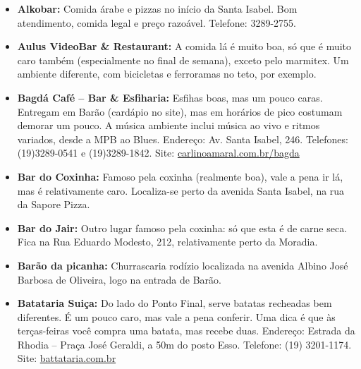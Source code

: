 \begin{itemize}
\item  \textbf{Alkobar:} Comida árabe e pizzas no início da Santa Isabel. Bom atendimento, comida legal e preço razoável. Telefone: 3289-2755.
\end{itemize}

\begin{itemize}
\item  \textbf{Aulus VideoBar \& Restaurant:} A comida lá é muito boa, só que é muito caro também (especialmente no final de semana), exceto pelo marmitex. Um ambiente diferente, com bicicletas e ferroramas no teto, por exemplo.
\end{itemize}

\begin{itemize}
\item  \textbf{Bagdá Café -- Bar \& Esfiharia:} Esfihas boas, mas um pouco caras. Entregam em Barão (cardápio no site), mas em horários de pico costumam demorar um pouco. A música ambiente inclui música ao vivo e ritmos variados, desde a MPB ao Blues. Endereço: Av. Santa Isabel, 246. Telefones: (19)3289-0541 e (19)3289-1842. Site: \url{carlinoamaral.com.br/bagda}
\end{itemize}

\begin{itemize}
\item  \textbf{Bar do Coxinha:} Famoso pela coxinha (realmente boa), vale a pena ir lá, mas é relativamente caro. Localiza-se perto da avenida Santa Isabel, na rua da Sapore Pizza.
\end{itemize}

\begin{itemize}
\item  \textbf{Bar do Jair:} Outro lugar famoso pela coxinha: só que esta é de carne seca. Fica na Rua Eduardo Modesto, 212, relativamente perto da Moradia.
\end{itemize}

\begin{itemize}
\item  \textbf{Barão da picanha:} Churrascaria rodízio localizada na avenida Albino José Barbosa de Oliveira, logo na entrada de Barão.
\end{itemize}

\begin{itemize}
\item  \textbf{Batataria Suiça:} Do lado do Ponto Final, serve batatas recheadas bem diferentes. É um pouco caro, mas vale a pena conferir. Uma dica é que às terças-feiras você compra uma batata, mas recebe duas. Endereço: Estrada da Rhodia -- Praça José Geraldi, a 50m do posto Esso. Telefone: (19) 3201-1174. Site: \url{battataria.com.br}
\end{itemize}

